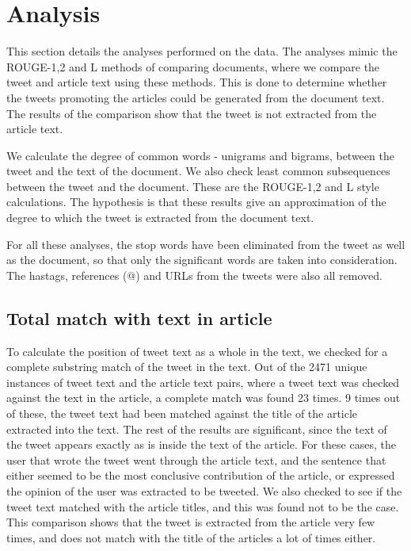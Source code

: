 \section{Analysis}
\label{sec:analysis}

This section details the analyses performed on the data. The analyses mimic the ROUGE-1,2 and L methods of comparing documents, where we compare the tweet and article text using these methods. This is done to determine whether the tweets promoting the articles could be generated from the document text. The results of the comparison show that the tweet is not extracted from the article text. 

We calculate the degree of common words - unigrams and bigrams, between the tweet and the text of the document. We also check least common subsequences between the tweet and the document. These are the ROUGE-1,2 and L style calculations. The hypothesis is that these results give an approximation of the degree to which the tweet is extracted from the document text. 

For all these analyses, the stop words have been eliminated from the tweet as well as the document, so that only the significant words are taken into consideration. The hastags, references (@) and URLs from the tweets were also all removed.

\subsection {Total match with text in article}

To calculate the position of tweet text as a whole in the text, we checked for a complete substring match of the tweet in the text. Out of the 2471 unique instances of tweet text and the article text pairs, where a tweet text was checked against the text in the article, a complete match was found 23 times. 9 times out of these, the tweet text had been matched against the title of the article extracted into the text. The rest of the results are significant, since the text of the tweet appears exactly as is inside the text of the article. For these cases, the user that wrote the tweet went through the article text, and the sentence that either seemed to be the most conclusive contribution of the article, or expressed the opinion of the user was extracted to be tweeted. We also checked to see if the tweet text matched with the article titles, and this was found not to be the case. This comparison shows that the tweet is extracted from the article very few times, and does not match with the title of the articles a lot of times either. 

